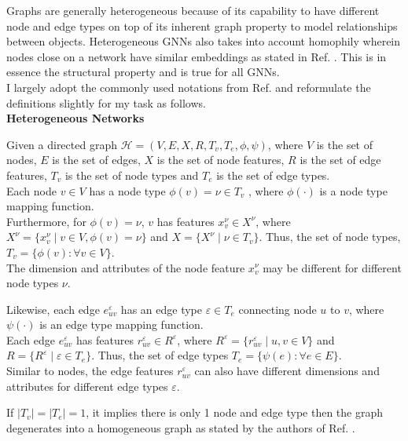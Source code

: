 \documentclass{report} %
\begin{document}
Graphs are generally heterogeneous because of its capability to have different node and edge types on top of its inherent graph property to model relationships between objects.
Heterogeneous \ac{GNN}s also takes into account homophily wherein nodes close on a network have similar embeddings as stated in Ref. \cite{HGNN-2020}.
This is in essence the structural property and is true for all \ac{GNN}s. \\

I largely adopt the commonly used notations from Ref. \cite{ML HGNN-2023} and reformulate the definitions slightly for my task as follows. \\

\textbf{Heterogeneous Networks}

Given a directed graph $\mathcal{H} = (V, E, X, R, T_v, T_e, \phi, \psi)$, 
where $V$ is the set of nodes, $E$  is the set of edges, $X$ is the set of node features, $R$ is the set of edge features, $T_v$ is the set of node types and 
$T_e$ is the set of edge types.\\

Each node $v \in V $ has a node type $\phi(v) = \nu \in T_v$ , where $\phi(\cdot)$ is a node type mapping function.\\
Furthermore, for $\phi(v) = \nu$, $v$ has features $x_v^{\nu} \in X^{\nu}$, 
where $X^{\nu} = \{ x_v^{\nu} \mid v \in V, \phi(v) = \nu \}$ and $X = \{ X^{\nu} \mid \nu \in T_v \}$. 
Thus, the set of node types, $T_v = \{ \phi(v) : \forall v \in V \}$.\\
The dimension and attributes of the node feature $x_v^{\nu}$ may be different for different node types $\nu$. 

Likewise, each edge $e_{uv}^{\varepsilon}$ has an edge type $\varepsilon \in T_e$ connecting node $u$ to $v$, where $\psi(\cdot)$ is an edge type mapping function. \\
Each edge $e_{uv}^{\varepsilon}$ has features $r_{uv}^{\varepsilon} \in R^{\varepsilon}$, 
where $R^{\varepsilon} = \{ r_{uv}^{\varepsilon} \mid u, v \in V \}$ and $R = \{ R^{\varepsilon} \mid \varepsilon \in T_e \}$. 
Thus, the set of edge types $T_e = \{ \psi(e) : \forall e \in E \}$. \\
Similar to nodes, the edge features $r_{uv}^{\varepsilon}$ can also have different dimensions and attributes for different edge types $\varepsilon$. 

If $|T_v| = |T_e| = 1$, it implies there is only 1 node and edge type then the graph degenerates into a homogeneous graph as stated by the authors of Ref. \cite{SE HGNN-2023}.
\end{document}
